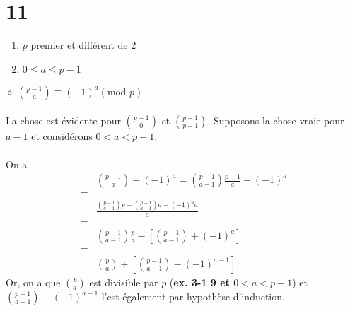 \documentclass[a4paper,10pt]{article}
\begin{document}
\section*{11}
\begin{enumerate}
	\item $p$ premier et différent de 2
	\item $0 \leq a \leq p-1$
\end{enumerate}
$\diamond$ \textbf{$\binom{p-1}{a} \equiv (-1)^a (\text{mod } p)$}
\\
\\
La chose est évidente pour $\binom{p-1}{0}$ et $\binom{p-1}{p-1}$. Supposons la chose vraie pour $a-1$ et considérons $0 < a < p-1$.
\\
\\
On a 
\begin{align*}
	& \binom{p-1}{a} - (-1)^a = \binom{p-1}{a-1}\frac{p-1}{a} - (-1)^a \\
	= \\
	& \frac{\binom{p-1}{a-1}p - \binom{p-1}{a-1}a - (-1)^a a}{a} \\
	= \\
	& \binom{p-1}{a-1}\frac{p}{a} - \left[\binom{p-1}{a-1} + (-1)^{a} \right] \\
	= \\
	& \binom{p}{a} + \left[\binom{p-1}{a-1} - (-1)^{a-1} \right]
\end{align*}
Or, on a que $\binom{p}{a}$ est divisible par $p$ (\textbf{ex. 3-1 9 et $0 < a < p-1$}) et $\binom{p-1}{a-1} - (-1)^{a-1}$ l'est également par hypothèse d'induction. 
\end{document}
